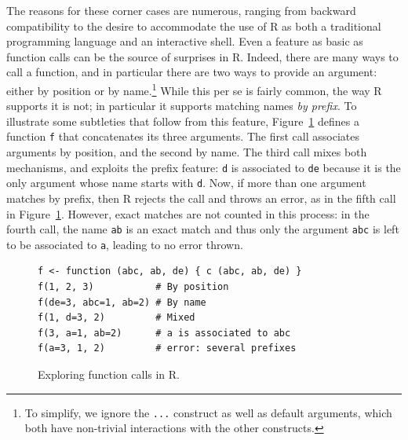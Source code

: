 \documentclass[
    sigplan,
    10pt,
    review, %
    natbib=false %
 ]{acmart}
\begin{document}
The reasons for these corner cases are numerous, ranging from backward compatibility to the desire to accommodate the use of R as both a traditional programming language and an interactive shell.
Even a feature as basic as function calls can be the source of surprises in R.
Indeed, there are many ways to call a function, and in particular there are two ways to provide an argument: either by position or by name.\footnote{
    To simplify, we ignore the \texttt{...} construct
    as well as default arguments, which both have non-trivial interactions with the other constructs.} While this per se is fairly common, the way R supports it is not; in particular it supports matching names {\em by prefix}.
%
To illustrate some subtleties that follow from this feature,
Figure~\ref{fig:calls} defines a function \texttt{f} that concatenates its three arguments. The first call associates arguments by position, and the second by name. The third call mixes both mechanisms, and exploits the prefix feature: \texttt{d} is associated to \texttt{de}
because it is the only argument whose name starts with \texttt{d}.
Now, if more than one argument matches by prefix,
then R rejects the call and throws an error,
as in the fifth call in Figure~\ref{fig:calls}.
However, exact matches are not counted in this process:
in the fourth call,
the name \texttt{ab} is an exact match
and thus only the argument \texttt{abc}
is left to be associated to \texttt{a},
leading to no error thrown.

\begin{figure}[t]
\begin{verbatim}
f <- function (abc, ab, de) { c (abc, ab, de) }
f(1, 2, 3)           # By position
f(de=3, abc=1, ab=2) # By name
f(1, d=3, 2)         # Mixed
f(3, a=1, ab=2)      # a is associated to abc
f(a=3, 1, 2)         # error: several prefixes
\end{verbatim}
\vspace{-1em}
\caption{Exploring function calls in R.}
\label{fig:calls}
\end{figure}
\end{document}
